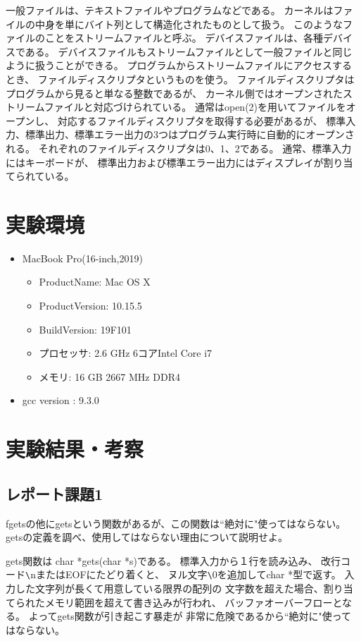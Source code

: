 \documentclass[12pt]{jarticle}
\begin{document}
一般ファイルは、テキストファイルやプログラムなどである。
カーネルはファイルの中身を単にバイト列として構造化されたものとして扱う。
このようなファイルのことをストリームファイルと呼ぶ。
デバイスファイルは、各種デバイスである。
デバイスファイルもストリームファイルとして一般ファイルと同じように扱うことができる。
プログラムからストリームファイルにアクセスするとき、
ファイルディスクリプタというものを使う。
ファイルディスクリプタはプログラムから見ると単なる整数であるが、
カーネル側ではオープンされたストリームファイルと対応づけられている。
通常はopen(2)を用いてファイルをオープンし、
対応するファイルディスクリプタを取得する必要があるが、
標準入力、標準出力、標準エラー出力の3つはプログラム実行時に自動的にオープンされる。
それぞれのファイルディスクリプタは0、1、2である。
通常、標準入力にはキーボードが、
標準出力および標準エラー出力にはディスプレイが割り当てられている。

\clearpage
\section{実験環境}
\begin{itemize}
    \item MacBook Pro(16-inch,2019)
          \begin{itemize}
              \item ProductName: Mac OS X
              \item ProductVersion:	10.15.5
              \item BuildVersion: 19F101
              \item プロセッサ: 2.6 GHz 6コアIntel Core i7
              \item メモリ: 16 GB 2667 MHz DDR4
          \end{itemize}
    \item gcc version : 9.3.0
\end{itemize}

\section{実験結果・考察}
\subsection{レポート課題1}
\begin{shadebox}
    fgetsの他にgetsという関数があるが、この関数は``絶対に"使ってはならない。
    getsの定義を調べ、使用してはならない理由について説明せよ。
\end{shadebox}
gets関数は char *gets(char *s)である。
標準入力から１行を読み込み、
改行コード\verb|\|nまたはEOFにたどり着くと、
ヌル文字\verb|\|0を追加してchar *型で返す。
入力した文字列が長くて用意している限界の配列の
文字数を超えた場合、割り当てられたメモリ範囲を超えて書き込みが行われ、
バッファオーバーフローとなる。
よってgets関数が引き起こす暴走が
非常に危険であるから``絶対に"使ってはならない。
\end{document}
